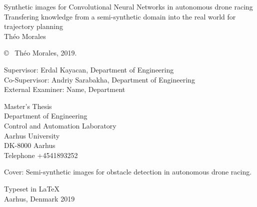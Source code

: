 \newpage
\thispagestyle{plain}
\vspace*{4.5cm}
Synthetic images for Convolutional Neural Networks in autonomous
drone racing\\
Transfering knowledge from a semi-synthetic domain into the real world for
trajectory planning\\
Théo Morales \setlength{\parskip}{1cm}

\copyright ~ Théo Morales, 2019. \setlength{\parskip}{1cm}

Supervisor: Erdal Kayacan, Department of Engineering\\
Co-Supervisor: Andriy Sarabakha, Department of Engineering\\
External Examiner: Name, Department \setlength{\parskip}{1cm}

Master's Thesis\\	%
Department of Engineering\\
Control and Automation Laboratory\\
Aarhus University\\
DK-8000 Aarhus\\
Telephone +4541893252 \setlength{\parskip}{0.5cm}

\vfill
Cover: Semi-synthetic images for obstacle detection in autonomous drone racing. \setlength{\parskip}{0.5cm}

Typeset in \LaTeX \\
Aarhus, Denmark 2019

